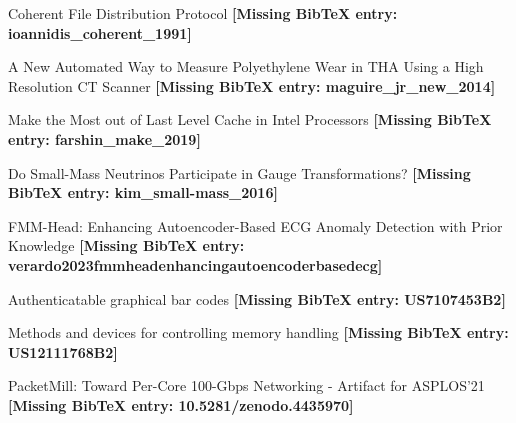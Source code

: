 
\begin{ListOfPapers}
  \item \label{paper:A} Coherent File Distribution Protocol \textbf{[Missing BibTeX entry: ioannidis\_coherent\_1991]}
  \item \label{paper:B} A New Automated Way to Measure Polyethylene Wear in THA Using a High Resolution CT Scanner \textbf{[Missing BibTeX entry: maguire\_jr\_new\_2014]}
  \item \label{paper:C} Make the Most out of Last Level Cache in Intel Processors \textbf{[Missing BibTeX entry: farshin\_make\_2019]}
  \item \label{paper:D} Do Small-Mass Neutrinos Participate in Gauge Transformations? \textbf{[Missing BibTeX entry: kim\_small-mass\_2016]}
  \item \label{paper:E} FMM-Head: Enhancing Autoencoder-Based ECG Anomaly Detection with Prior Knowledge \textbf{[Missing BibTeX entry: verardo2023fmmheadenhancingautoencoderbasedecg]}
\end{ListOfPapers}

\begin{ListOfPatents}
  \item \label{patent:A} Authenticatable graphical bar codes \textbf{[Missing BibTeX entry: US7107453B2]}
  \item \label{patent:B} Methods and devices for controlling memory handling \textbf{[Missing BibTeX entry: US12111768B2]}
\end{ListOfPatents}

\begin{ListOfArtifacts}
  \item \label{artifact:A} PacketMill: Toward Per-Core 100-Gbps Networking - Artifact for ASPLOS’21 \textbf{[Missing BibTeX entry: 10.5281/zenodo.4435970]}
\end{ListOfArtifacts}

